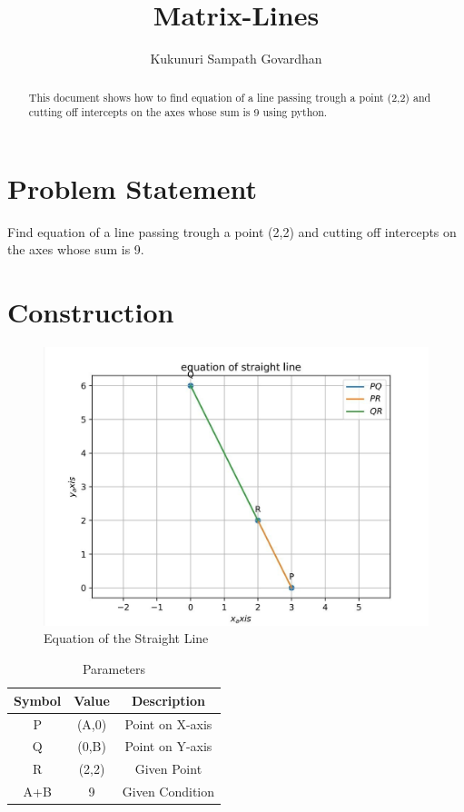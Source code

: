 \documentclass[journal,12pt,twocolumn]{IEEEtran}
\title{
Matrix-Lines
}
\author{Kukunuri Sampath Govardhan}
\begin{document}
\maketitle
\tableofcontents
\begin{abstract}
This document shows how to find equation of a line passing trough a point (2,2) and cutting off intercepts on the axes whose sum is 9 using python.
\end{abstract}
\section{Problem Statement}
Find equation of a line passing trough a point (2,2) and cutting off intercepts on the axes whose sum is 9.\\
\section{Construction}
\begin{figure}[h]
    \centering
\includegraphics[width=\columnwidth]{figs/assign4.png}
    \caption{Equation of the Straight Line}
    \label{fig:my_label}
\end{figure}


    
\begin{table}[h]
    \centering
    \begin{tabular}{|c|c|c|}
       \hline
       \textbf{Symbol}&\textbf{Value}&\textbf{Description}  \\
       \hline
        P & (A,0) & Point on X-axis\\
        \hline
        Q & (0,B) & Point on Y-axis\\
        \hline
        R & (2,2) & Given Point \\
        \hline
        A+B & 9 & Given Condition\\
        \hline
    \end{tabular}
    \caption{Parameters}
    \label{tab:my_label}
\end{table}
\end{document}
